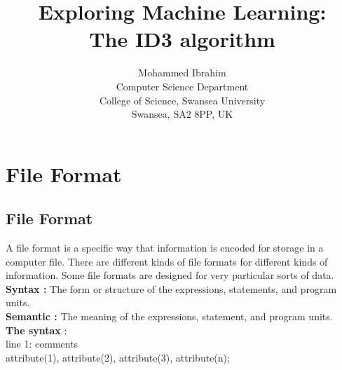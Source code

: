 \documentclass{report}
\begin{document}
\title{Exploring Machine Learning:\\
  The ID3 algorithm}

\author{Mohammed Ibrahim\\
 Computer Science Department\\
  College of Science, Swansea University\\
  Swansea, SA2 8PP, UK
}

\maketitle

\tableofcontents

\chapter{File Format}
\label{sec:fileformat}

\section{File Format}
\label{sec:file}

A file format is a specific way that information is encoded for storage in a computer file. There are different kinds of file formats for different kinds of information. Some file formats are designed for very particular sorts of data.\\
{\bf Syntax :} The form or structure of the expressions, statements, and program units.\\
{\bf Semantic :} The meaning of the expressions, statement, and program units. 	\\

{\bf The syntax} :\\

line 1: comments\\
attribute(1), attribute(2), attribute(3), attribute(n);
\end{document}
